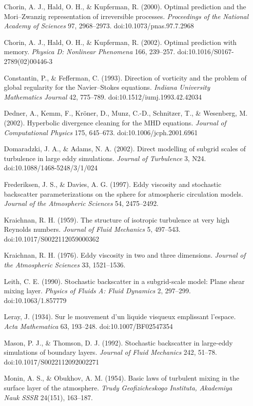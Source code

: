 \documentclass[11pt]{article}
\begin{document}
Chorin, A. J., Hald, O. H., \& Kupferman, R. (2000). Optimal prediction and the Mori–Zwanzig representation of irreversible processes. \emph{Proceedings of the National Academy of Sciences} 97, 2968–2973. doi:10.1073/pnas.97.7.2968


Chorin, A. J., Hald, O. H., \& Kupferman, R. (2002). Optimal prediction with memory. \emph{Physica D: Nonlinear Phenomena} 166, 239–257. doi:10.1016/S0167-2789(02)00446-3


Constantin, P., \& Fefferman, C. (1993). Direction of vorticity and the problem of global regularity for the Navier–Stokes equations. \emph{Indiana University Mathematics Journal} 42, 775–789. doi:10.1512/iumj.1993.42.42034


Dedner, A., Kemm, F., Kröner, D., Munz, C.-D., Schnitzer, T., \& Wesenberg, M. (2002). Hyperbolic divergence cleaning for the MHD equations. \emph{Journal of Computational Physics} 175, 645–673. doi:10.1006/jcph.2001.6961


Domaradzki, J. A., \& Adams, N. A. (2002). Direct modelling of subgrid scales of turbulence in large eddy simulations. \emph{Journal of Turbulence} 3, N24. doi:10.1088/1468-5248/3/1/024


Frederiksen, J. S., \& Davies, A. G. (1997). Eddy viscosity and stochastic backscatter parameterizations on the sphere for atmospheric circulation models. \emph{Journal of the Atmospheric Sciences} 54, 2475–2492.


Kraichnan, R. H. (1959). The structure of isotropic turbulence at very high Reynolds numbers. \emph{Journal of Fluid Mechanics} 5, 497–543. doi:10.1017/S0022112059000362


Kraichnan, R. H. (1976). Eddy viscosity in two and three dimensions. \emph{Journal of the Atmospheric Sciences} 33, 1521–1536.


Leith, C. E. (1990). Stochastic backscatter in a subgrid-scale model: Plane shear mixing layer. \emph{Physics of Fluids A: Fluid Dynamics} 2, 297–299. doi:10.1063/1.857779


Leray, J. (1934). Sur le mouvement d'un liquide visqueux emplissant l'espace. \emph{Acta Mathematica} 63, 193–248. doi:10.1007/BF02547354


Mason, P. J., \& Thomson, D. J. (1992). Stochastic backscatter in large-eddy simulations of boundary layers. \emph{Journal of Fluid Mechanics} 242, 51–78. doi:10.1017/S0022112092002271


Monin, A. S., \& Obukhov, A. M. (1954). Basic laws of turbulent mixing in the surface layer of the atmosphere. \emph{Trudy Geofizicheskogo Instituta, Akademiya Nauk SSSR} 24(151), 163–187.
\end{document}
